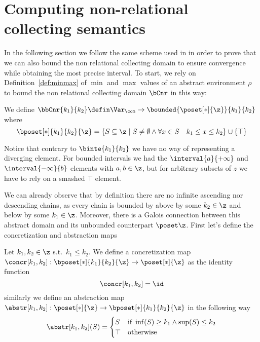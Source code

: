\section{Computing non-relational collecting semantics}\label{sec:computingnonrel}

In the following section we follow the same scheme used in
 in order to prove that we can also bound
the non relational collecting domain to ensure convergence while
obtaining the most precise interval.  To start, we rely on
Definition~\ref{def:minmax} of \(\min\) and \(\max\) values of an
abstract environment \(\rho\) to bound the non relational collecting
domain \(\bCnr\) in this way:

\begin{definition}
  We define
  \(\bbCnr{k_1}{k_2} \defin \Var_{\com} \to \bounded{\poset[*]{\z}}{k_1}{k_2}\) where
  \begin{equation*}
    \bposet[*]{k_1}{k_2}{\z} = \{S \subseteq \z \mid S \neq \emptyset \land \forall x \in S \quad k_1 \leq x \leq k_2\} \cup \{\top\}
  \end{equation*}
\end{definition}
Notice that contrary to \(\binte{k_1}{k_2}\) we have no way of
representing a diverging element. For bounded intervals we had the
\(\interval{a}{+\infty}\) and \(\interval{-\infty}{b}\) elements with
\(a,b\in\z\), but for arbitrary subsets of \(z\) we have to rely on a
smashed \(\top\) element.

\medskip

\noindent
We can already observe that by definition there are no infinite
ascending nor descending chains, as every chain is bounded by above
by some \(k_2 \in \z\) and below by some \(k_1\in\z\). Moreover, there
is a Galois connection between this abstract domain and its unbounded
counterpart \(\poset\z\). First let's define the concretization and
abstraction maps

\begin{definition}\label{def:abstrnrb}
  Let \(k_1,k_2\in\z\) s.t.\ \(k_1 \leq k_2\). We define a
  concretization map
  \(\concr[k_1,k_2] : \bposet[*]{k_1}{k_2}{\z} \to \poset[*]{\z}\) as
  the identity function
  \begin{equation*}
    \concr[k_1,k_2] = \id
  \end{equation*}
  similarly we define an abstraction map
  \(\abstr[k_1,k_2] : \poset[*]{\z} \to \bposet[*]{k_1}{k_2}{\z}\) in
  the following way
  \begin{equation*}
    \abstr[k_1,k_2](S) = \begin{cases}
      S & \text{if } \inf(S) \geq k_1 \land \sup(S) \leq k_2 \\
      \top & \text{otherwise}
    \end{cases}
  \end{equation*}
\end{definition}

